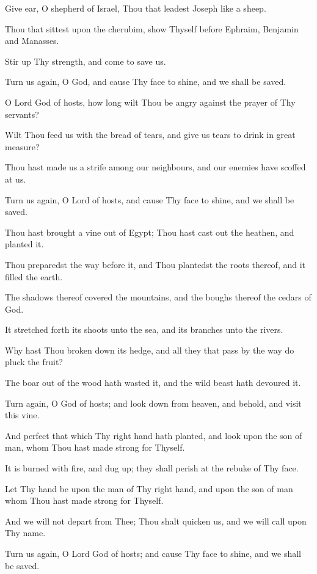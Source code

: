Give ear, O shepherd of Israel, Thou that leadest Joseph like a sheep.

Thou that sittest upon the cherubim, show Thyself before Ephraim, Benjamin and Manasses.

Stir up Thy strength, and come to save us.

Turn us again, O God, and cause Thy face to shine, and we shall be saved.

O Lord God of hosts, how long wilt Thou be angry against the prayer of Thy servants?

Wilt Thou feed us with the bread of tears, and give us tears to drink in great measure?

Thou hast made us a strife among our neighbours, and our enemies have scoffed at us.

Turn us again, O Lord of hosts, and cause Thy face to shine, and we shall be saved.

Thou hast brought a vine out of Egypt; Thou hast cast out the heathen, and planted it.

Thou preparedst the way before it, and Thou plantedst the roots thereof, and it filled the earth.

The shadows thereof covered the mountains, and the boughs thereof the cedars of God.

It stretched forth its shoots unto the sea, and its branches unto the rivers.

Why hast Thou broken down its hedge, and all they that pass by the way do pluck the fruit?

The boar out of the wood hath wasted it, and the wild beast hath devoured it.

Turn again, O God of hosts; and look down from heaven, and behold, and visit this vine.

And perfect that which Thy right hand hath planted, and look upon the son of man, whom Thou hast made strong for Thyself.

It is burned with fire, and dug up; they shall perish at the rebuke of Thy face.

Let Thy hand be upon the man of Thy right hand, and upon the son of man whom Thou hast made strong for Thyself.

And we will not depart from Thee; Thou shalt quicken us, and we will call upon Thy name.

Turn us again, O Lord God of hosts; and cause Thy face to shine, and we shall be saved.
